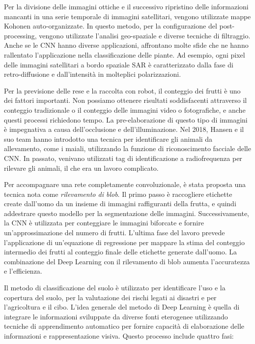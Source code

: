 Per la divisione delle immagini ottiche e il successivo ripristino delle informazioni mancanti in una serie temporale di immagini satellitari, vengono utilizzate mappe Kohonen auto-organizzate. In questo metodo, per la configurazione del post-processing, vengono utilizzate l'analisi geo-spaziale e diverse tecniche di filtraggio. Anche se le CNN hanno diverse applicazioni, affrontano molte sfide che ne hanno rallentato l'applicazione nella classificazione delle piante. Ad esempio, ogni pixel delle immagini satellitari a bordo spaziale SAR è caratterizzato dalla fase di retro-diffusione e dall'intensità in molteplici polarizzazioni.

Per la previsione delle rese e la raccolta con robot, il conteggio dei frutti è uno dei fattori importanti. Non possiamo ottenere risultati soddisfacenti attraverso il conteggio tradizionale o il conteggio delle immagini video o fotografiche, e anche questi processi richiedono tempo. La pre-elaborazione di questo tipo di immagini è impegnativa a causa dell'occlusione e dell'illuminazione. Nel 2018, Hansen e il suo team hanno introdotto una tecnica per identificare gli animali da allevamento, come i maiali, utilizzando la funzione di riconoscimento facciale delle CNN. In passato, venivano utilizzati tag di identificazione a radiofrequenza per rilevare gli animali, il che era un lavoro complicato.

Per accompagnare una rete completamente convoluzionale, è stata proposta una tecnica nota come \textit{rilevamento di blob}. Il primo passo è raccogliere etichette create dall'uomo da un insieme di immagini raffiguranti della frutta, e quindi addestrare questo modello per la segmentazione delle immagini. Successivamente, la CNN è utilizzata per conteggiare le immagini biforcate e fornire un'approssimazione del numero di frutti. L'ultima fase del lavoro prevede l'applicazione di un'equazione di regressione per mappare la stima del conteggio intermedio dei frutti al conteggio finale delle etichette generate dall'uomo. La combinazione del Deep Learning con il rilevamento di blob aumenta l'accuratezza e l'efficienza.

Il metodo di classificazione del suolo è utilizzato per identificare l'uso e la copertura del suolo, per la valutazione dei rischi legati ai disastri e per l'agricoltura e il cibo. L'idea generale del metodo di Deep Learning è quella di integrare le informazioni sviluppate da diverse fonti eterogenee utilizzando tecniche di apprendimento automatico per fornire capacità di elaborazione delle informazioni e rappresentazione visiva. Questo processo include quattro fasi: 

